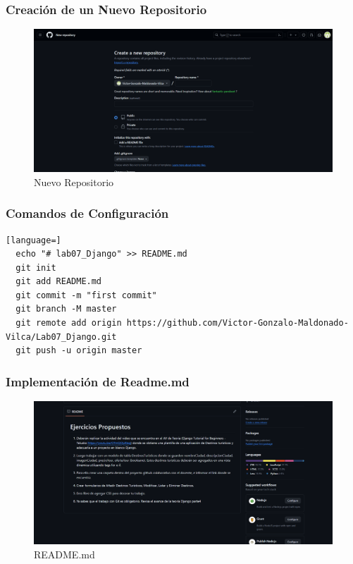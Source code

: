 \documentclass{article}
\begin{document}
  \subsubsection{Creación de un Nuevo Repositorio}
  \begin{figure}[H]
    \centering
    \includegraphics[width=1\textwidth, keepaspectratio]{img/crear.png}
    \caption{Nuevo Repositorio}
  \end{figure}
  
	
  \subsubsection{Comandos de Configuración}
  \begin{lstlisting}[language=]
  echo "# lab07_Django" >> README.md
  git init
  git add README.md
  git commit -m "first commit"
  git branch -M master
  git remote add origin https://github.com/Victor-Gonzalo-Maldonado-Vilca/Lab07_Django.git
  git push -u origin master
  \end{lstlisting}
  \newpage
  
  
  \subsubsection{Implementación de Readme.md}
  \begin{figure}[H]
    \centering
    \includegraphics[width=1\textwidth, keepaspectratio]{img/readme.png}
    \caption{README.md}
  \end{figure}
  
\end{document}
